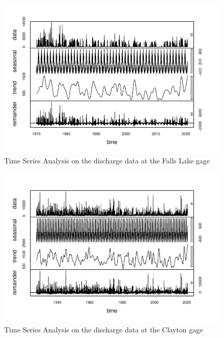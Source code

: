 \documentclass[
  12pt,
]{article}
\begin{document}
\begin{figure}

\includegraphics{Gardner_Zeng_pdf_output_files/figure-latex/Time series Falls Lake-1} \hfill{}

\caption{Time Series Analysis on the discharge data at the Falls Lake gage}\label{fig:Time series Falls Lake}
\end{figure}

\begin{figure}

\includegraphics{Gardner_Zeng_pdf_output_files/figure-latex/Time series Clayton-1} \hfill{}

\caption{Time Series Analysis on the discharge data at the Clayton gage}\label{fig:Time series Clayton}
\end{figure}
\end{document}
